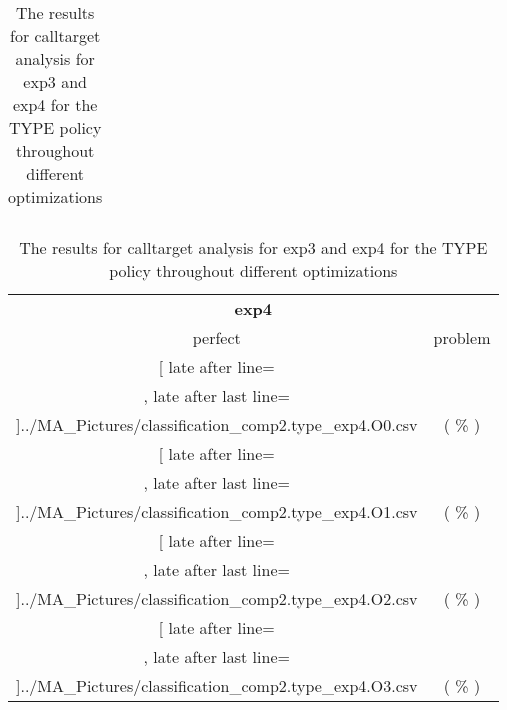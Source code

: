 \begin{table}[!htbp]
{\begin{tabular}{l|c|c|c}
    	\end{tabular}

	\begin{tabular}{|c|c}%

	\toprule
	\multicolumn{2}{c}{\bfseries exp4}\\
	
	perfect &  problem %
	\\\midrule
	\csvreader[ late after line=\\, late after last line=\\\midrule]{../MA_Pictures/classification_comp2.type_exp4.O0.csv}{
}
	{\csvcolxiii ( \csvcolxiv \% ) & \csvcolxv ( \csvcolxvi \% )}%



\multicolumn{1}{c}{} 
	\\\midrule
	\csvreader[ late after line=\\, late after last line=\\\midrule]{../MA_Pictures/classification_comp2.type_exp4.O1.csv}{
}
	{\csvcolxiii ( \csvcolxiv \% ) & \csvcolxv ( \csvcolxvi \% )}%
	
	
\multicolumn{1}{c}{}
	\\\midrule
	\csvreader[ late after line=\\, late after last line=\\\midrule]{../MA_Pictures/classification_comp2.type_exp4.O2.csv}{
}
	{\csvcolxiii ( \csvcolxiv \% ) & \csvcolxv ( \csvcolxvi \% )}%
	

\multicolumn{1}{c}{}
	\\\midrule
	\csvreader[ late after line=\\, late after last line=\\\bottomrule]{../MA_Pictures/classification_comp2.type_exp4.O3.csv}{
}
	{\csvcolxiii ( \csvcolxiv \% ) & \csvcolxv ( \csvcolxvi \% )}%


    	\end{tabular}
}
		\caption {The results for calltarget analysis for exp3 and exp4 for the TYPE policy throughout different optimizations}
		\label{tbl:CTdestinterexp34TYPE}
\end{table}



